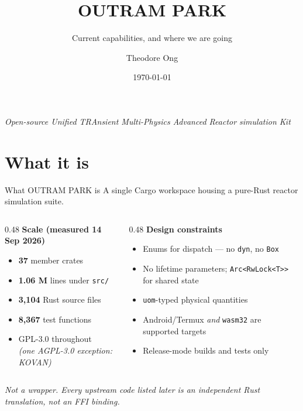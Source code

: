 \documentclass[aspectratio=169,11pt]{beamer}
\title{\textbf{OUTRAM PARK}}
\subtitle{Current capabilities, and where we are going}
\author{Theodore Ong}
\institute{\small National University of Singapore}
\date{\today}
\newcommand{\caveat}[1]{{\footnotesize\color{opmuted}\textit{#1}}}
\begin{document}
\begin{frame}[plain]
  \titlepage
  \begin{center}
  \caveat{Open-source Unified TRAnsient Multi-Physics Advanced Reactor simulation Kit}
  \end{center}
\end{frame}

\section{What it is}

\begin{frame}{What OUTRAM PARK is}
  A single Cargo workspace housing a pure-Rust reactor simulation suite.
  \vspace{1em}
  \begin{columns}[T]
    \begin{column}{0.48\textwidth}
      \textbf{Scale (measured 14 Sep 2026)}
      \begin{itemize}
        \item \textbf{37} member crates
        \item \textbf{1.06 M} lines under \texttt{src/}
        \item \textbf{3{,}104} Rust source files
        \item \textbf{8{,}367} test functions
        \item GPL-3.0 throughout \\ \caveat{(one AGPL-3.0 exception: KOVAN)}
      \end{itemize}
    \end{column}
    \begin{column}{0.48\textwidth}
      \textbf{Design constraints}
      \begin{itemize}
        \item Enums for dispatch --- no \texttt{dyn}, no \texttt{Box}
        \item No lifetime parameters; \texttt{Arc<RwLock<T>>} for shared state
        \item \texttt{uom}-typed physical quantities
        \item Android/Termux \emph{and} \texttt{wasm32} are supported targets
        \item Release-mode builds and tests only
      \end{itemize}
    \end{column}
  \end{columns}
  \vspace{1em}
  \caveat{Not a wrapper. Every upstream code listed later is an independent Rust
  translation, not an FFI binding.}
\end{frame}
\end{document}

